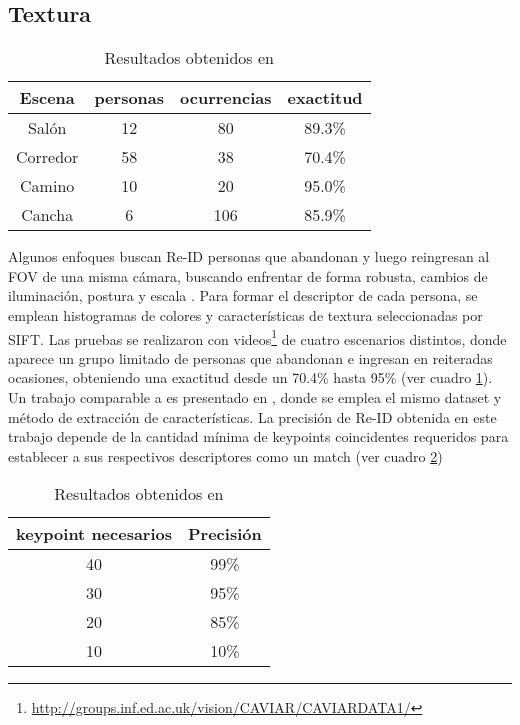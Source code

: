 \documentclass[../memoria.tex]{subfiles}
\begin{document}
\subsection{Textura}
\begin{table}
  \begin{center}
    \begin{tabular}{cccc}
      \hline
      Escena    & personas  & ocurrencias & exactitud \\
      \hline
      Salón     & 12        & 80          & 89.3\% \\
      Corredor  & 58        & 38          & 70.4\% \\
      Camino    & 10        & 20          & 95.0\% \\
      Cancha    & 6         & 106         & 85.9\% \\
      \hline
    \end{tabular}  
  \end{center}
  \caption{Resultados obtenidos en  \cite{hu2008people}}
\label{resultados SIFT hu2008}
\end{table}
Algunos enfoques buscan Re-ID personas que abandonan y luego reingresan al FOV de una misma cámara, buscando enfrentar de forma robusta, cambios de iluminación, postura y escala \cite{hu2008people}. Para formar el descriptor de cada persona, se emplean histogramas de colores y características de textura seleccionadas por SIFT. Las pruebas se realizaron con videos\footnote{\url{http://groups.inf.ed.ac.uk/vision/CAVIAR/CAVIARDATA1/}} de cuatro escenarios distintos, donde aparece un grupo limitado de personas que abandonan e ingresan en reiteradas ocasiones, obteniendo una exactitud desde un 70.4\% hasta 95\% (ver cuadro \ref{resultados SIFT hu2008}). Un trabajo comparable a \cite{hu2008people} es presentado en \cite{hamdoun2008person}, donde se emplea el mismo dataset y método de extracción de características. La precisión de Re-ID obtenida en este trabajo depende de la cantidad mínima de keypoints coincidentes requeridos para establecer a sus respectivos descriptores como un match (ver cuadro \ref{resultados SIFT hamdoun2008person})  

\begin{table}
  \begin{center}
    \begin{tabular}{cc}
      \hline
      keypoint necesarios & Precisión \\
      \hline
      40 & 99\% \\
      30 & 95\% \\
      20 & 85\% \\
      10 & 10\% \\
      \hline
    \end{tabular}  
  \end{center}
  \caption{Resultados obtenidos en  \cite{hamdoun2008person}}
\label{resultados SIFT hamdoun2008person}
\end{table}
\end{document}
